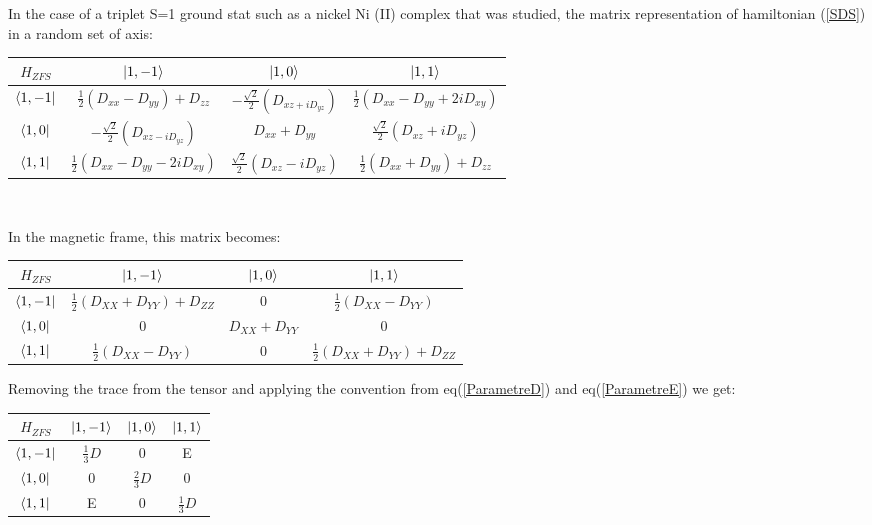 \documentclass[12pt]{article}
\numberwithin{equation}{section}
\begin{document}
In the case of a triplet S=1 ground stat such as a nickel Ni (II) complex that was studied, the matrix representation of hamiltonian (\ref{SDS}) in a random set of axis:
\begin{center}
\begin{tabular}{ c | c c c}
    $H_{ZFS}$ & $\ket{1,-1}$ & $\ket{1,0} $& $\ket{1,1}$ \\
    \hline
    $\bra{1,-1} $&  $\frac{1}{2}(D_{xx}-D_{yy})+D_{zz}$ & $-\frac{\sqrt{2}}{2}(D_{xz+iD_{yz}}) $ & $\frac{1}{2}(D_{xx}-D_{yy}+2iD_{xy})$ \\
    $\bra{1,0}$ & $-\frac{\sqrt{2}}{2}(D_{xz-iD_{yz}})  $& $ D_{xx}+D_{yy}  $&$ \frac{\sqrt{2}}{2}(D_{xz}+iD_{yz})$ \\
    $\bra{1,1} $& $ \frac{1}{2}(D_{xx}-D_{yy}-2iD_{xy}) $& $\frac{\sqrt{2}}{2}(D_{xz}-iD_{yz})$  & $\frac{1}{2}(D_{xx}+D_{yy})+D_{zz} $ \\
\end{tabular}\\
\end{center}
In the magnetic frame, this matrix becomes:
\begin{center}
\begin{tabular}{c | c c c}
    $H_{ZFS}$ & $\ket{1,-1}$ & $\ket{1,0} $& $\ket{1,1}$ \\
    \hline
    $\bra{1,-1}$ & $\frac{1}{2}(D_{XX}+D_{YY})+D_{ZZ}$ & 0 & $\frac{1}{2}(D_{XX}-D_{YY})$\\
    $\bra{1,0}$ & 0 & $D_{XX}+D_{YY}$ & 0\\
    $\bra{1,1}$ &  $\frac{1}{2}(D_{XX}-D_{YY})$ & 0 & $\frac{1}{2}(D_{XX}+D_{YY})+D_{ZZ}$
\end{tabular}
\end{center}
Removing the trace from the tensor and applying the convention from eq(\ref{ParametreD}) and eq(\ref{ParametreE}) we get:
\begin{center}
\begin{tabular}{c | c c c}
    $H_{ZFS}$ & $\ket{1,-1}$ & $\ket{1,0}$ & $\ket{1,1}$\\
    \hline
    $\bra{1,-1}$ & $\frac{1}{3}D$ & 0 & E\\
    $\bra{1,0}$ & 0 & $\frac{2}{3}D $& 0\\
    $\bra{1,1}$ & E & 0 & $\frac{1}{3}D$
\end{tabular}
\end{center}
\end{document}
